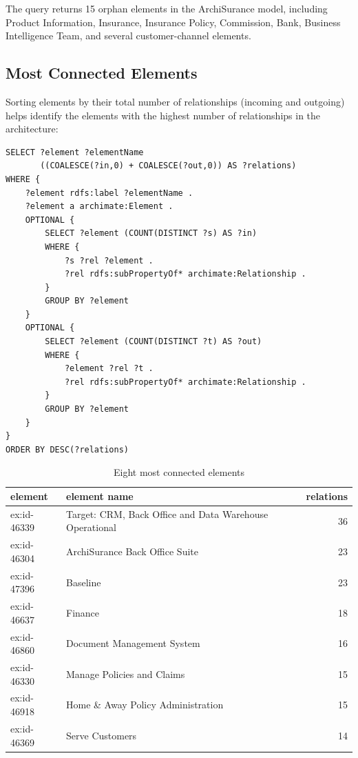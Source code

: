 The query returns 15 orphan elements in the ArchiSurance model, including Product Information, Insurance, Insurance Policy, Commission, Bank, Business Intelligence Team, and several customer-channel elements.

\subsection{Most Connected Elements}
\label{subsec:most-connected}

Sorting elements by their total number of relationships (incoming and outgoing) helps identify the elements with the highest number of relationships in the architecture:

\begin{lstlisting}[caption={Rank elements by total number of relationships}]
SELECT ?element ?elementName
       ((COALESCE(?in,0) + COALESCE(?out,0)) AS ?relations)
WHERE {
    ?element rdfs:label ?elementName .
    ?element a archimate:Element .
    OPTIONAL {
        SELECT ?element (COUNT(DISTINCT ?s) AS ?in)
        WHERE {
            ?s ?rel ?element .
            ?rel rdfs:subPropertyOf* archimate:Relationship .
        }
        GROUP BY ?element
    }
    OPTIONAL {
        SELECT ?element (COUNT(DISTINCT ?t) AS ?out)
        WHERE {
            ?element ?rel ?t .
            ?rel rdfs:subPropertyOf* archimate:Relationship .
        }
        GROUP BY ?element
    }
}
ORDER BY DESC(?relations)
\end{lstlisting}

\begin{table}[H]
\centering
\caption{Eight most connected elements}
\label{tab:most-connected-results}
\small
\begin{tabularx}{\linewidth}{l X r}
\toprule
\textbf{element} & \textbf{element name} & \textbf{relations} \\
\midrule
ex:id-46339 & Target: CRM, Back Office and Data Warehouse Operational & 36 \\
ex:id-46304 & ArchiSurance Back Office Suite & 23 \\
ex:id-47396 & Baseline & 23 \\
ex:id-46637 & Finance & 18 \\
ex:id-46860 & Document Management System & 16 \\
ex:id-46330 & Manage Policies and Claims & 15 \\
ex:id-46918 & Home \& Away Policy Administration & 15 \\
ex:id-46369 & Serve Customers & 14 \\
\bottomrule
\end{tabularx}
\end{table}

